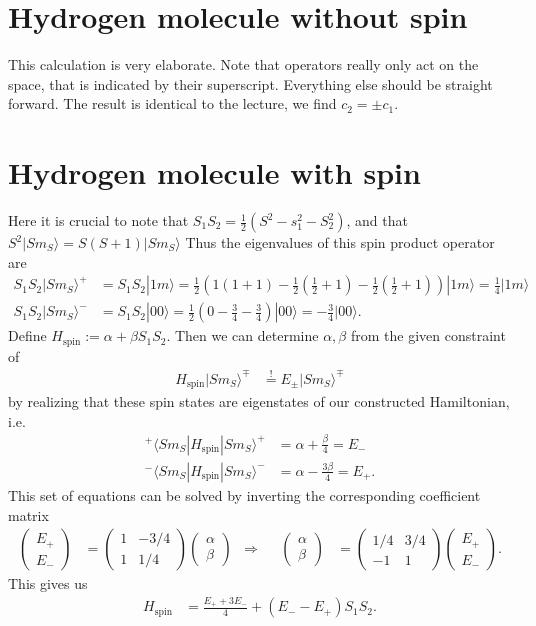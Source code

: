 \documentclass[english, parskip=full]{scrartcl}
\newcommand{\braket}{}
\newcommand{\kla}{}
\newcommand{\tecxt}{}
\newcommand{\Ket}{}
\begin{document}
\section{Hydrogen molecule without spin}
This calculation is very elaborate. 
Note that operators really only act on the space, that is indicated by their superscript.
Everything else should be straight forward.
The result is identical to the lecture, we find $c_2=\pm c_1$.
\section{Hydrogen molecule with spin}
Here it is crucial to note that $S_1S_2=\frac{1}{2}(S^2-s_1^2-S_2^2)$, and that $S^2\Ket | {Sm_S} \rangle=S(S+1)\Ket | {Sm_S} \rangle$
Thus the eigenvalues of this spin product operator are
\begin{align*}
S_1S_2\Ket | {Sm_S} \rangle^+&=S_1S_2\Ket | {1 m} \rangle=\frac{1}{2}\kla\left( {1(1+1)-\frac{1}{2}\kla\left( {\frac{1}{2}+1} \right)-\frac{1}{2}\kla\left( {\frac{1}{2}+1} \right)} \right)\Ket | {1 m} \rangle=\frac{1}{4}\Ket | {1 m} \rangle\\
S_1S_2\Ket | {Sm_S} \rangle^-&=S_1S_2\Ket | {0 0} \rangle=\frac{1}{2}\kla\left( {0-\frac{3}{4}-\frac{3}{4}} \right)\Ket | {00} \rangle=-\frac{3}{4}\Ket | {00} \rangle.
\end{align*}
Define $H_\tecxt\text{spin}:=\alpha +\beta S_1S_2$. 
Then we can determine $\alpha,\beta$ from the given constraint of 
\begin{align*}
H_\tecxt\text{spin}\Ket | {Sm_S} \rangle^\mp &\overset{!}{=}E_\pm\Ket | {Sm_S} \rangle^\mp
\end{align*}
by realizing that these spin states are eigenstates of our constructed Hamiltonian, i.e.
\begin{align*}
{}^+\braket\langle {Sm_S} | {H_\tecxt\text{spin}} | {Sm_S}\rangle^+&=\alpha + \frac{\beta}{4}=E_-\\
{}^-\braket\langle {Sm_S} | {H_\tecxt\text{spin}} | {Sm_S}\rangle^-&=\alpha - \frac{3\beta}{4}=E_+.
\end{align*}
This set of equations can be solved by inverting the corresponding coefficient matrix
\begin{align*}
\begin{pmatrix}
E_+ \\ E_-
\end{pmatrix}&=\begin{pmatrix}
1 & -3/4 \\ 1 & 1/4
\end{pmatrix}\begin{pmatrix}
\alpha \\ \beta
\end{pmatrix}&\Rightarrow &&\begin{pmatrix}
\alpha \\ \beta
\end{pmatrix}&=\begin{pmatrix}
 1/4 & 3/4 \\ -1 & 1
\end{pmatrix}\begin{pmatrix}
E_+ \\ E_-
\end{pmatrix}.
\end{align*}
This gives us
\begin{align*}
H_\tecxt\text{spin} &=\frac{E_+ +3E_-}{4}+(E_- - E_+)S_1S_2.
\end{align*}
\end{document}
